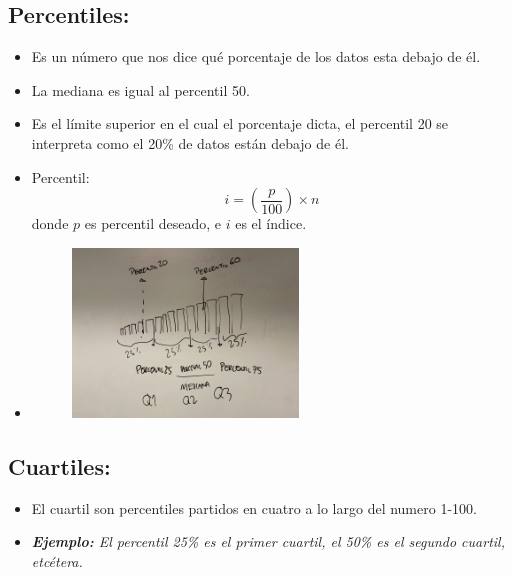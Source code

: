 \subsection{Percentiles:}
\begin{itemize}
    \item Es un número que nos dice qué porcentaje de los datos esta debajo de él.
    \item La mediana es igual al percentil 50.
    \item Es el límite superior en el cual el porcentaje dicta, el percentil 20 se interpreta como el 20\% de datos están debajo de él.
    \item Percentil:
        \[
          i = \left(\frac{p}{100}  \right) \times n
        \]
        donde $p$ es percentil deseado, e $i$ es el índice.
    
    \item 
        \begin{figure}[htbp]
            \centering
            \includegraphics[width=6cm]{Clases/Images/2020-01-14_01.jpeg} 
            \caption{}
            \label{}
        \end{figure} 
        
\end{itemize}

\subsection{Cuartiles:}
\begin{itemize}
    \item El cuartil son percentiles partidos en cuatro a lo largo del numero 1-100.
    \item \emph{\textbf{Ejemplo: }El percentil 25\% es el primer cuartil, el 50\% es el segundo cuartil, etcétera.}
\end{itemize}


